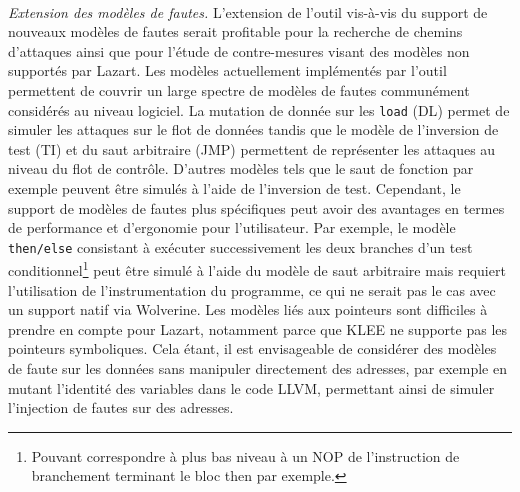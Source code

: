     \paragraph{}
    \textit{Extension des modèles de fautes.}      
    L'extension de l'outil vis-à-vis du support de nouveaux modèles de fautes serait profitable pour la recherche de chemins d'attaques ainsi que pour l'étude de contre-mesures visant des modèles non supportés par Lazart.
    Les modèles actuellement implémentés par l'outil permettent de couvrir un large spectre de modèles de fautes communément considérés au niveau logiciel. La mutation de donnée sur les \texttt{load} (\gls{DL}) permet de simuler les attaques sur le flot de données tandis que le modèle de l'inversion de test (\gls{TI}) et du saut arbitraire (\gls{JMP}) permettent de représenter les attaques au niveau du flot de contrôle.
    D'autres modèles tels que le saut de fonction par exemple peuvent être simulés à l'aide de l'inversion de test.
    Cependant, le support de modèles de fautes plus spécifiques peut avoir des avantages en termes de performance et d'ergonomie pour l'utilisateur. Par exemple, le modèle \texttt{then/else} consistant à exécuter successivement les deux branches d'un test conditionnel\footnote{Pouvant correspondre à plus bas niveau à un NOP de l'instruction de branchement terminant le bloc then par exemple.} peut être simulé à l'aide du modèle de saut arbitraire mais requiert l'utilisation de l'instrumentation du programme, ce qui ne serait pas le cas avec un support \og natif \fg{} via Wolverine.
    Les modèles liés aux pointeurs sont difficiles à prendre en compte pour Lazart, notamment parce que KLEE ne supporte pas les pointeurs symboliques. Cela étant, il est envisageable de considérer des modèles de faute sur les données sans manipuler directement des adresses, par exemple en mutant l'identité des variables dans le code LLVM, permettant ainsi de simuler l'injection de fautes sur des adresses.
    
